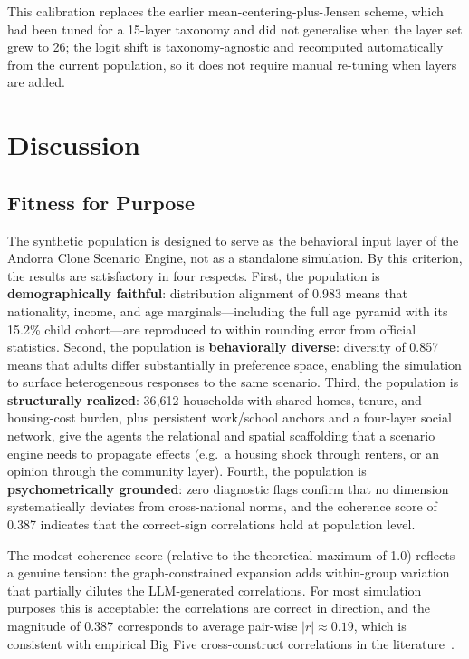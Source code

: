 \documentclass[a4paper,12pt]{article}
\begin{document}
This calibration replaces the earlier mean-centering-plus-Jensen scheme, which had
been tuned for a 15-layer taxonomy and did not generalise when the layer set grew to
26; the logit shift is taxonomy-agnostic and recomputed automatically from the current
population, so it does not require manual re-tuning when layers are added.

\section{Discussion}
\label{sec:discussion}

\subsection{Fitness for Purpose}
\label{subsec:fitness}

The synthetic population is designed to serve as the behavioral input layer
of the Andorra Clone Scenario Engine, not as a standalone simulation.
By this criterion, the results are satisfactory in four respects.
First, the population is \textbf{demographically faithful}: distribution
alignment of 0.983 means that nationality, income, and age marginals---including
the full age pyramid with its 15.2\% child cohort---are reproduced to within
rounding error from official statistics. Second, the population is
\textbf{behaviorally diverse}: diversity of 0.857 means that adults differ
substantially in preference space, enabling the simulation to surface
heterogeneous responses to the same scenario. Third, the population is
\textbf{structurally realized}: 36{,}612 households with shared homes, tenure,
and housing-cost burden, plus persistent work/school anchors and a four-layer
social network, give the agents the relational and spatial scaffolding that a
scenario engine needs to propagate effects (e.g.\ a housing shock through renters,
or an opinion through the community layer). Fourth, the population is
\textbf{psychometrically grounded}: zero diagnostic flags confirm that no
dimension systematically deviates from cross-national norms, and the coherence
score of 0.387 indicates that the correct-sign correlations hold at population
level.

The modest coherence score (relative to the theoretical maximum of 1.0)
reflects a genuine tension: the graph-constrained expansion adds
within-group variation that partially dilutes the LLM-generated
correlations. For most simulation purposes this is acceptable: the
correlations are correct in direction, and the magnitude of 0.387
corresponds to average pair-wise $|r| \approx 0.19$, which is consistent
with empirical Big Five cross-construct correlations in the
literature~\cite{mccrae2003personality}.
\end{document}
